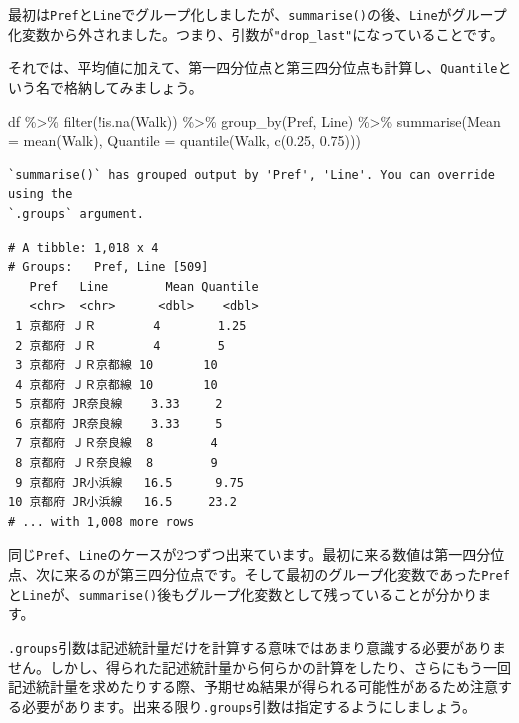 \documentclass[
  a4paper,
  pandoc,
  ja=standard,
  jafont=haranoaji]{bxjsbook}
\newenvironment{Shaded}{\begin{snugshade}}{\end{snugshade}}
\newcommand{\AttributeTok}[1]{\textcolor[rgb]{0.00,0.48,0.65}{#1}}
\newcommand{\FloatTok}[1]{\textcolor[rgb]{0.68,0.00,0.00}{#1}}
\newcommand{\FunctionTok}[1]{\textcolor[rgb]{0.28,0.35,0.67}{#1}}
\newcommand{\NormalTok}[1]{\textcolor[rgb]{0.00,0.48,0.65}{#1}}
\newcommand{\SpecialCharTok}[1]{\textcolor[rgb]{0.37,0.37,0.37}{#1}}
\begin{document}
最初は\texttt{Pref}と\texttt{Line}でグループ化しましたが、\texttt{summarise()}の後、\texttt{Line}がグループ化変数から外されました。つまり、引数が\texttt{"drop\_last"}になっていることです。

それでは、平均値に加えて、第一四分位点と第三四分位点も計算し、\texttt{Quantile}という名で格納してみましょう。

\begin{Shaded}
\begin{Highlighting}[numbers=left,,]
\NormalTok{df }\SpecialCharTok{\%\textgreater{}\%}
  \FunctionTok{filter}\NormalTok{(}\SpecialCharTok{!}\FunctionTok{is.na}\NormalTok{(Walk)) }\SpecialCharTok{\%\textgreater{}\%}
  \FunctionTok{group\_by}\NormalTok{(Pref, Line) }\SpecialCharTok{\%\textgreater{}\%}
  \FunctionTok{summarise}\NormalTok{(}\AttributeTok{Mean     =} \FunctionTok{mean}\NormalTok{(Walk),}
            \AttributeTok{Quantile =} \FunctionTok{quantile}\NormalTok{(Walk, }\FunctionTok{c}\NormalTok{(}\FloatTok{0.25}\NormalTok{, }\FloatTok{0.75}\NormalTok{)))}
\end{Highlighting}
\end{Shaded}

\begin{verbatim}
`summarise()` has grouped output by 'Pref', 'Line'. You can override using the
`.groups` argument.
\end{verbatim}

\begin{verbatim}
# A tibble: 1,018 x 4
# Groups:   Pref, Line [509]
   Pref   Line        Mean Quantile
   <chr>  <chr>      <dbl>    <dbl>
 1 京都府 ＪＲ        4        1.25
 2 京都府 ＪＲ        4        5   
 3 京都府 ＪＲ京都線 10       10   
 4 京都府 ＪＲ京都線 10       10   
 5 京都府 JR奈良線    3.33     2   
 6 京都府 JR奈良線    3.33     5   
 7 京都府 ＪＲ奈良線  8        4   
 8 京都府 ＪＲ奈良線  8        9   
 9 京都府 JR小浜線   16.5      9.75
10 京都府 JR小浜線   16.5     23.2 
# ... with 1,008 more rows
\end{verbatim}

同じ\texttt{Pref}、\texttt{Line}のケースが2つずつ出来ています。最初に来る数値は第一四分位点、次に来るのが第三四分位点です。そして最初のグループ化変数であった\texttt{Pref}と\texttt{Line}が、\texttt{summarise()}後もグループ化変数として残っていることが分かります。

\texttt{.groups}引数は記述統計量だけを計算する意味ではあまり意識する必要がありません。しかし、得られた記述統計量から何らかの計算をしたり、さらにもう一回記述統計量を求めたりする際、予期せぬ結果が得られる可能性があるため注意する必要があります。出来る限り\texttt{.groups}引数は指定するようにしましょう。
\end{document}
